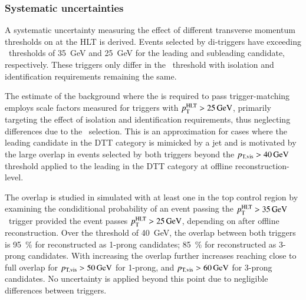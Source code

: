 


\subsubsection{Systematic uncertainties}


A systematic uncertainty measuring the effect of different transverse
momentum thresholds on \tauhadvis at the HLT is derived.  Events
selected by di-\tauhadvis triggers have \tauhadvis exceeding
\pTHLT~thresholds of \SI{35}{\GeV} and \SI{25}{\GeV} for the leading
and subleading candidate, respectively. These triggers only differ in
the \pTHLT~threshold with isolation and identification requirements
remaining the same.

The estimate of the \ttbarFakes background where the \faketauhadvis is
required to pass trigger-matching employs scale factors measured for
triggers with $p_{\text{T}}^{\text{HLT}} > \SI{25}{\ensuremath{\text{GeV}}}$, primarily targeting the effect
of isolation and identification requirements, thus neglecting
differences due to the \pTHLT~selection. This is an approximation for
cases where the leading \tauhadvis candidate in the DTT category is
mimicked by a jet and is motivated by the large overlap in events
selected by both triggers beyond the $\pTvis > \SI{40}{\GeV}$
threshold applied to the leading \tauhadvis in the DTT category at
offline reconstruction-level.

The overlap is studied in simulated \ttbar with at least one
\faketauhadvis in the top control region by examining the
condiditional probability of an event passing the
$p_{\text{T}}^{\text{HLT}} > \SI{35}{\ensuremath{\text{GeV}}}$~trigger provided the event passes
$p_{\text{T}}^{\text{HLT}} > \SI{25}{\ensuremath{\text{GeV}}}$, depending on \pTvis after offline \tauhadvis
reconstruction. Over the \pTvis threshold of \SI{40}{\GeV}, the
overlap between both triggers is \SI{95}{\percent} for \faketauhadvis
reconstructed as 1-prong candidates; \SI{85}{\percent} for
\faketauhadvis reconstructed as 3-prong candidates.  With
increasing \pTvis the overlap further increases reaching close to full
overlap for $p_\text{T,vis} > \SI{50}{\ensuremath{\text{GeV}}}$ for 1-prong, and
$p_\text{T,vis} > \SI{60}{\ensuremath{\text{GeV}}}$ for 3-prong candidates. No uncertainty is
applied beyond this point due to negligible differences between
triggers.

